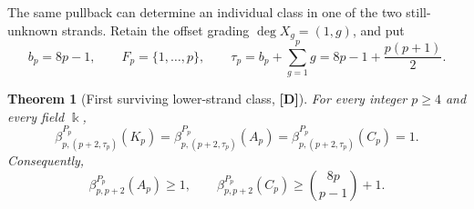 \documentclass[11pt]{article}
\newtheorem{theorem}{Theorem}[section]
\theoremstyle{definition}
\theoremstyle{remark}
\newcommand{\kfield}{\Bbbk}
\begin{document}
The same pullback can determine an individual class in one of the two still-unknown strands.
Retain the offset grading \(\deg X_g=(1,g)\), and put
\begin{equation}
b_p=8p-1,\qquad F_p=\{1,\ldots,p\},\qquad
\tau_p=b_p+\sum_{g=1}^p g=8p-1+\frac{p(p+1)}2.
\label{eq:first-surviving-data}
\end{equation}

\begin{theorem}[First surviving lower-strand class, {\bf[D]}]
\label{thm:first-surviving-lower}
For every integer \(p\ge4\) and every field \(\kfield\),
\begin{equation}
\beta_{p,(p+2,\tau_p)}^{P_p}(K_p)
=\beta_{p,(p+2,\tau_p)}^{P_p}(A_p)
=\beta_{p,(p+2,\tau_p)}^{P_p}(C_p)=1.
\label{eq:first-surviving-class}
\end{equation}
Consequently,
\begin{equation}
\beta_{p,p+2}^{P_p}(A_p)\ge1,
\qquad
\beta_{p,p+2}^{P_p}(C_p)\ge\binom{8p}{p-1}+1.
\label{eq:first-surviving-ordinary}
\end{equation}
\end{theorem}
\end{document}
